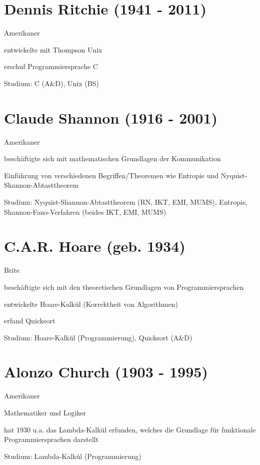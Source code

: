\documentclass[a4paper,12pt]{report}
\begin{document}
\section{Dennis Ritchie (1941 - 2011)}
\begin{itemize*}
	\item Amerikaner
	\item entwickelte mit Thompson Unix
	\item erschuf Programmiersprache C
	\item Studium: C (A\&D), Unix (BS)
\end{itemize*}

\section{Claude Shannon (1916 - 2001)}
\begin{itemize*}
	\item Amerikaner
	\item beschäftigte sich mit mathematischen Grundlagen der Kommunikation
	\item Einführung von verschiedenen Begriffen/Theoremen wie Entropie und Nyquist-Shannon-Abtasttheorem
	\item Studium: Nyquist-Shannon-Abtasttheorem (RN, IKT, EMI, MUMS), Entropie, Shannon-Fano-Verfahren (beides IKT, EMI, MUMS)
\end{itemize*}

\section{C.A.R. Hoare (geb. 1934)}
\begin{itemize*}
	\item Brite
	\item beschäftigte sich mit den theoretischen Grundlagen von Programmiersprachen
	\item entwickelte Hoare-Kalkül (Korrektheit von Algorithmen)
	\item erfand Quicksort
	\item Studium: Hoare-Kalkül (Programmierung), Quicksort (A\&D)
\end{itemize*}

\section{Alonzo Church (1903 - 1995)}
\begin{itemize*}
	\item Amerikaner
	\item Mathematiker und Logiker
	\item hat 1930 u.a. das Lambda-Kalkül erfunden, welches die Grundlage für funktionale Programmiersprachen darstellt
	\item Studium: Lambda-Kalkül (Programmierung)
\end{itemize*}
\end{document}
